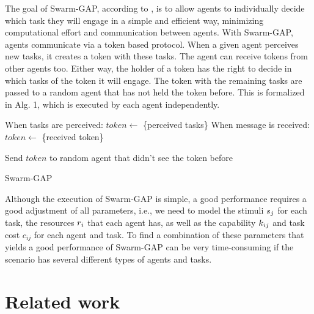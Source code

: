 \documentclass[a4paper]{sbgames}
\begin{document}
The goal of Swarm-GAP, according to \cite{Ferreira+2008ccmms}, is to allow agents to individually decide which task they will engage in a simple and efficient way, minimizing computational effort and communication between agents. With Swarm-GAP, agents communicate via a token based protocol. When a given agent perceives new tasks, it creates a token with these tasks. The agent can receive tokens from other agents too. Either way, the holder of a token has the right to decide in which tasks of the token it will engage. The token with the remaining tasks are passed to a random agent that has not held the token before. This is formalized in Alg. 1, which is executed by each agent independently.


\begin{algorithm}[ht]
\begin{algorithmic}
\STATE When tasks are perceived: $token \gets$ \{perceived tasks\}
\STATE When message is received: $token \gets$ \{received token\}

\ENDIF
\ENDFOR

\STATE Send $token$ to random agent that didn't see the token before
\end{algorithmic}
\caption{Swarm-GAP}
\end{algorithm}

Although the execution of Swarm-GAP is simple, a good performance requires a good adjustment of all parameters, i.e., we need to model the stimuli $s_j$ for each task, the resources $r_{i}$ that each agent has, as well as the capability $k_{ij}$ and task cost $c_{ij}$ for each agent and task. To find a combination of these parameters that yields a good performance of Swarm-GAP can be very time-consuming if the scenario has several different types of agents and tasks. 

\section{Related work}
\label{sec:related}
\end{document}
